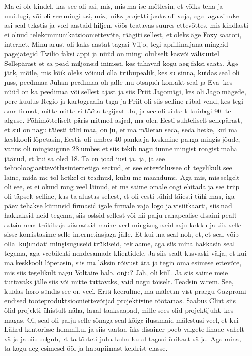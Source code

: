 Ma ei ole kindel, kas see oli asi, mis, mis ma ise mõtlesin, et võiks teha ja muidugi, või oli see mingi asi, mis, miks projekti jaoks oli vaja, aga, aga sihuke asi seal tekstis ja veel aastaid hiljem vöös teatavas suures ettevõttes, mis kindlasti ei olnud telekommunikatsiooniettevõte, räägiti sellest, et oleks äge Foxy saatori, internet. Minu arust oli kaks aastat tagasi Viljo, tegi aprillinaljana mingeid pagejategid Twilio faksi appi ja nüüd on mingi oluliselt kasvõi välisuutel. Sellepärast et sa pead miljoneid inimesi, kes tahavad kogu aeg faksi saata. Äge jätk, mõtle, mis kõik oleks võinud olla triibupealik, kes su sinna, kuidas seal oli juss, peedimaa Juhan peedimaa oli jälle mu otsapidi kontakt seal ja Eva, kes nüüd on ka peedimaa või sellest ajast ja siis Priit Jagomägi, kes oli Jago mägede, pere kuulus Regio ja kartograafia taga ja Priit oli siis selline räbal vend, kes tegi oma firmat, mitte mitte ei tööta tegijast. Ja, ja see oli siuke k kuidagi 90.-te alguse. Põhimõtteliselt päris mitmed asjad, ma olen Eesti suhteliselt sellepärast, et sul on nagu täiesti tühi maa, on ju, et ma mäletan seda, seda hetke, kui ma keskkooli lõpetasin, Eestis oli umbes 40 panka ja keskmine panga mingis jõude, vanus oli mingisugune 28 umbes et siis tekib nagu tunne mingist rongist maha jäänud, et kui sa oled 18. Ta on joad just ja, ja, ja see tehnoloogiaettevõtlusinternetiga seotud, et see ettevõtlussee oli tegelikult see laine, mida me tol hetkel ei teadnud, kuhu me maandume. Aga mis, mis selgelt oli see, et ei olnud rong veel läinud, et me saime omale ongi ehitada ja see triip oli täpselt selline, kus ta alustas sellest, et oli eesti tühid täiesti tühi maa, iga päev tehakse kümneid firmasid igale firmale vaja logo ja visiitkaarti, siis nad hakkaksid neid tegema, siis ostsid sellest või nii palju rahapealise disaini pealt ostsin oma trükikoja siis ostsid maine veel mingisuguseid asju kokku ja siis selle sisse komistasime selle internetiasjaga jälle. Et kui ma seal noh, et, et seal võib olla, kujundati mingisuguseid trükiseid, reklaame, aga siis mina hakkasin seal tegema, aga veebilehti nendesamade klientidele. Ja siis sealt kasvaski välja, et kui ma keskkooli lõpetasin, siis ma läksin rõivust ära ja tegin oma esimese ettevõte, mis siis tegelikult nagu Voltaire halo, onju? Jah, oli küll. Ja siis saime meie tuttavaks jälle siis või mitte tuttavaks, vaid nagu töiselt. Teadsin varem.
See, kuidas horo sündis see on veel.
Eriti keeruline, ma mäletan vist praegu Gazpromi endised tooteproduktsiooniettevõtjad projektivine töötamas. Saabus Clint siis õlid projekti ühistult näha, laual tanksaapad, mille sees olid projektijuht, kes magas. Oi, seal oli palju selle sõnaga seal kõige ilusamaid mälestusi veel, et kui Lähed kontorisse hommikul ja siis vaatad üks disainer poeb valgete linade vahelt välja ja siis selgub, et ta tõsteti juba kolm kuud tagasi ühikast välja. Aga mina, ta kogu aeg esimesel ööl ja hapupiimast keldrist elasse.
